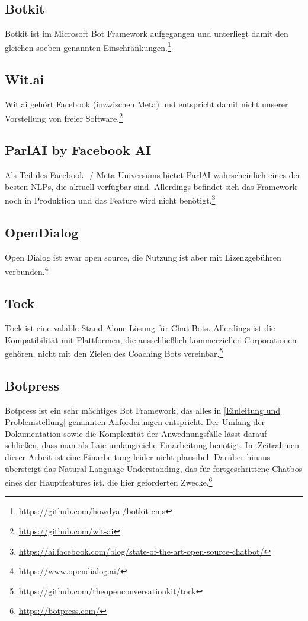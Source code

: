         \subsection{Botkit} 
            Botkit ist im Microsoft Bot Framework aufgegangen und unterliegt damit den gleichen soeben genannten Einschränkungen.\footnote{\url{https://github.com/howdyai/botkit-cms}} 
            
        \subsection{Wit.ai} 
            Wit.ai gehört Facebook (inzwischen Meta) und entspricht damit nicht unserer Vorstellung von freier Software.\footnote{\url{https://github.com/wit-ai}}        

        \subsection{ParlAI by Facebook AI} 
            Als Teil des Facebook- / Meta-Universums bietet ParlAI wahrscheinlich eines der besten NLPs, die aktuell verfügbar sind. Allerdings befindet sich das Framework noch in Produktion und das Feature wird nicht benötigt.\footnote{\url{https://ai.facebook.com/blog/state-of-the-art-open-source-chatbot/}}
                    
        \subsection{OpenDialog} 
            Open Dialog ist zwar open source, die Nutzung ist aber mit Lizenzgebühren verbunden.\footnote{\url{https://www.opendialog.ai/}}

        \subsection{Tock} 
            Tock ist eine valable Stand Alone Lösung für Chat Bots. Allerdings ist die Kompatibilität mit Plattformen, die ausschließlich kommerziellen Corporationen gehören, nicht mit den Zielen des Coaching Bots vereinbar.\footnote{\url{https://github.com/theopenconversationkit/tock}}
            
        \subsection{Botpress} 
            Botpress ist ein sehr mächtiges Bot Framework, das alles in \ref{Einleitung und Problemstellung} genannten Anforderungen entspricht. Der Umfang der Dokumentation sowie die Komplexität der Anwednungsfälle lässt darauf schließen, dass man als Laie umfangreiche Einarbeitung benötigt. Im Zeitrahmen dieser Arbeit ist eine Einarbeitung leider nicht plausibel. Darüber hinaus übersteigt das Natural Language Understanding, das für fortgeschrittene Chatbos eines der Hauptfeatures ist. die hier geforderten Zwecke.\footnote{\url{https://botpress.com/}}
            
